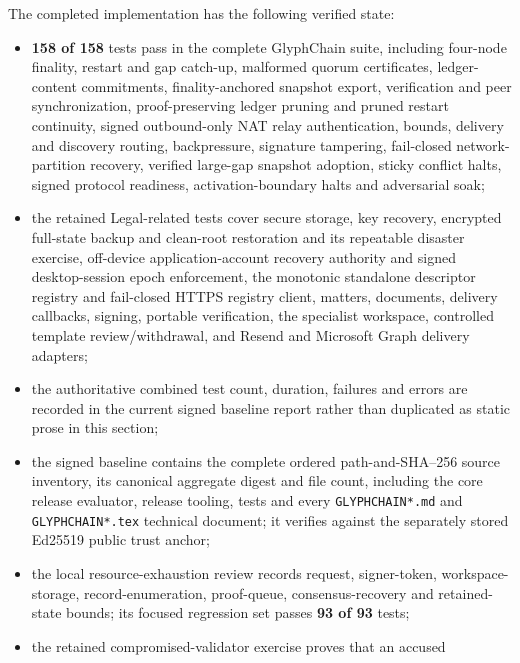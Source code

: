 The completed implementation has the following verified state:

\begin{itemize}
  \item \textbf{158 of 158} tests pass in the complete GlyphChain suite,
        including four-node finality, restart and gap catch-up, malformed quorum
        certificates, ledger-content commitments, finality-anchored snapshot
        export, verification and peer synchronization, proof-preserving ledger
        pruning and pruned restart continuity, signed outbound-only NAT relay
        authentication, bounds, delivery and discovery routing, backpressure,
        signature tampering, fail-closed network-partition recovery, verified
        large-gap snapshot adoption, sticky conflict halts, signed protocol
        readiness, activation-boundary halts and adversarial soak;
  \item the retained Legal-related tests cover secure storage, key recovery,
        encrypted full-state backup and clean-root restoration and its repeatable
        disaster exercise, off-device application-account recovery authority and
        signed desktop-session epoch enforcement, the monotonic standalone
        descriptor registry and fail-closed HTTPS registry client, matters,
        documents, delivery callbacks, signing, portable verification, the
        specialist workspace, controlled template review/withdrawal, and Resend
        and Microsoft Graph delivery adapters;
  \item the authoritative combined test count, duration, failures and errors are
        recorded in the current signed baseline report rather than duplicated as
        static prose in this section;
  \item the signed baseline contains the complete ordered path-and-SHA--256 source
        inventory, its canonical aggregate digest and file count, including the
        core release evaluator, release tooling, tests and every
        \texttt{GLYPHCHAIN*.md} and \texttt{GLYPHCHAIN*.tex} technical document;
        it verifies against the separately stored Ed25519 public trust anchor;
  \item the local resource-exhaustion review records request, signer-token,
        workspace-storage, record-enumeration, proof-queue, consensus-recovery
        and retained-state bounds; its focused regression set passes
        \textbf{93 of 93} tests;
  \item the retained compromised-validator exercise proves that an accused

\end{itemize}
